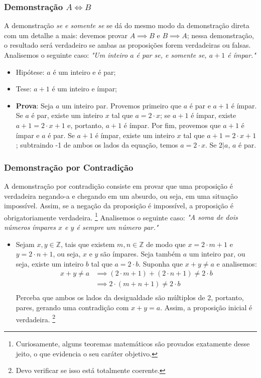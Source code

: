 \documentclass[13pt,letterpaper]{article}
\begin{document}
\subsubsection{Demonstração $A \iff B$}
A demonstração \emph{se e somente se} se dá do mesmo modo da demonstração direta com um detalhe a mais: devemos provar $A \implies B$ e $B \implies A$; nessa demonstração, o resultado será verdadeiro se ambas as proposições forem verdadeiras ou falsas.
Analisemos o seguinte caso: \emph{"Um inteiro $a$ é par se, e somente se, $a + 1$ é ímpar."}
\begin{itemize}
    \item Hipótese: $a$ é um inteiro e é par;
    \item Tese: $a + 1$ é um inteiro e ímpar;
    \item \textbf{Prova}: Seja $a$ um inteiro par. Provemos primeiro que $a$ é par e $a + 1$ é ímpar. Se $a$ é par, existe um inteiro $x$ tal que $a = 2 \cdot x$; se $a + 1$ é ímpar, existe $a + 1 = 2 \cdot x + 1$ e, portanto, $a + 1$ é ímpar.
    Por fim, provemos que $a + 1$ é ímpar e $a$ é par.
    Se $a + 1$ é ímpar, existe um inteiro $x$ tal que $a + 1 = 2 \cdot x + 1$; subtraindo -1 de ambos os lados da equação, temos $a = 2 \cdot x$. Se $2|a$, $a$ é par.
    
\end{itemize}

\subsubsection{Demonstração por Contradição}
A demonstração por contradição consiste em provar que uma proposição é verdadeira negando-a e chegando em um absurdo, ou seja, em uma situação impossível. Assim, se a negação da proposição é impossível, a proposição é obrigatoriamente verdadeira. \footnote{Curiosamente, alguns teoremas matemáticos são provados exatamente desse jeito, o que evidencia o seu caráter objetivo.}
Analisemos o seguinte caso: \emph{"A soma de dois números ímpares $x$ e $y$ é sempre um número par."}
\begin{itemize}
    \item Sejam $x, y \in \mathbb{Z}$, tais que existem $m, n \in \mathbb{Z}$ de modo que $x = 2 \cdot m + 1$ e $y = 2 \cdot n + 1$, ou seja, $x$ e $y$ são ímpares. Seja também $a$ um inteiro par, ou seja, existe um inteiro $b$ tal que $a = 2 \cdot b$. Suponha que $x + y \ne a$ e analisemos:
    \begin{align*}
        x + y \ne a &\implies
        (2 \cdot m + 1) + (2 \cdot n + 1) \ne 2 \cdot b \\ &\implies
        2 \cdot (m + n + 1) \ne 2 \cdot b \\
    \end{align*}
    Perceba que ambos os lados da desigualdade são múltiplos de 2, portanto, pares, gerando uma contradição com $x + y = a$. Assim, a proposição inicial é verdadeira. \footnote{Devo verificar se isso está totalmente coerente.}
\end{itemize}
\end{document}
